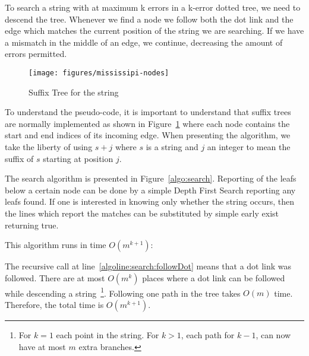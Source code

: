 To search a string with at maximum k errors in a k-error dotted tree, we need to descend the tree. Whenever we find a node we follow both the dot link and the edge which matches the current position of the string we are searching. If we have a mismatch in the middle of an edge, we continue, decreasing the amount of errors permitted.

\begin{figure}
\texttt{[image: figures/mississipi-nodes]}
\caption{Suffix Tree for the string }%
\label{fig:mississipi-nodes}
\end{figure}

To understand the pseudo-code, it is important to understand that suffix trees are normally implemented as shown in Figure~\ref{fig:mississipi-nodes} where each node contains the start and end indices of its incoming edge. When presenting the algorithm, we take the liberty of using $s+j$ where $s$ is a string and $j$ an integer to mean the suffix of $s$ starting at position $j$.



The search algorithm is presented in Figure~\ref{algo:search}. Reporting of the leafs below a certain node can be done by a simple Depth First Search reporting any leafs found. If one is interested in knowing only whether the string occurs, then the lines which report the matches can be substituted by simple early exist returning true.

This algorithm runs in time $O(m^{k+1})$:

The recursive call at line~\ref{algoline:search:followDot} means that a dot link was followed. There are at most $O(m^k)$ places where a dot link can be followed while descending a string~\footnote{For $k=1$ each point in the string. For $k>1$, each path for $k-1$, can now have at most $m$ extra branches.}. Following one path in the tree takes $O(m)$ time. Therefore, the total time is $O(m^{k+1})$.
